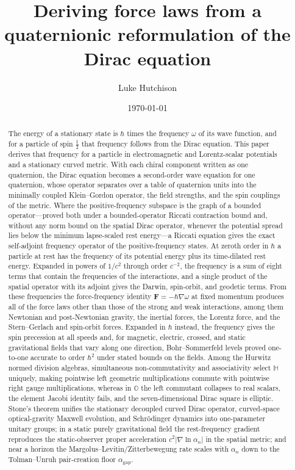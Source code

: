 \documentclass[aps,prd,onecolumn,tightenlines,nofootinbib,notitlepage,11pt,floatfix]{revtex4-2}
\theoremstyle{indentedtheorem}
\begin{document}
\title{Deriving force laws from a quaternionic reformulation of the Dirac equation}
\newif\ifanonymous \anonymousfalse %
\newcommand{\companionauthor}{\ifanonymous Anonymous\else L.~Hutchison\fi}\ifanonymous\else\author{Luke Hutchison}
\noaffiliation\fi
\date{\today}

\begin{abstract}
The energy of a stationary state is $\hbar$ times the frequency $\omega$ of its wave function, and for a particle of spin $\tfrac{1}{2}$ that frequency follows from the Dirac equation. This paper derives that frequency for a particle in electromagnetic and Lorentz-scalar potentials and a stationary curved metric. With each chiral component written as one quaternion, the Dirac equation becomes a second-order wave equation for one quaternion, whose operator separates over a table of quaternion units into the minimally coupled Klein--Gordon operator, the field strengths, and the spin couplings of the metric. Where the positive-frequency subspace is the graph of a bounded operator---proved both under a bounded-operator Riccati contraction bound and, without any norm bound on the spatial Dirac operator, whenever the potential spread lies below the minimum lapse-scaled rest energy---a Riccati equation gives the exact self-adjoint frequency operator of the positive-frequency states. At zeroth order in $\hbar$ a particle at rest has the frequency of its potential energy plus its time-dilated rest energy. Expanded in powers of $1/c^2$ through order $c^{-2}$, the frequency is a sum of eight terms that contain the frequencies of the interactions, and a single product of the spatial operator with its adjoint gives the Darwin, spin-orbit, and geodetic terms. From these frequencies the force-frequency identity $\mathbf{F}=-\hbar\nabla\omega$ at fixed momentum produces all of the force laws other than those of the strong and weak interactions, among them Newtonian and post-Newtonian gravity, the inertial forces, the Lorentz force, and the Stern--Gerlach and spin-orbit forces. Expanded in $\hbar$ instead, the frequency gives the spin precession at all speeds and, for magnetic, electric, crossed, and static gravitational fields that vary along one direction, Bohr--Sommerfeld levels proved one-to-one accurate to order $\hbar^2$ under stated bounds on the fields. Among the Hurwitz normed division algebras, simultaneous non-commutativity and associativity select $\mathbb{H}$ uniquely, making pointwise left geometric multiplications commute with pointwise right gauge multiplications, whereas in $\mathbb{O}$ the left commutant collapses to real scalars, the element Jacobi identity fails, and the seven-dimensional Dirac square is elliptic. Stone's theorem unifies the stationary decoupled curved Dirac operator, curved-space optical-gravity Maxwell evolution, and Schr\"odinger dynamics into one-parameter unitary groups; in a static purely gravitational field the rest-frequency gradient reproduces the static-observer proper acceleration $c^2|\nabla\ln\alpha_n|$ in the spatial metric; and near a horizon the Margolus--Levitin/Zitterbewegung rate scales with $\alpha_n$ down to the Tolman--Unruh pair-creation floor $\alpha_\text{gap}$.
\end{abstract}
\end{document}
